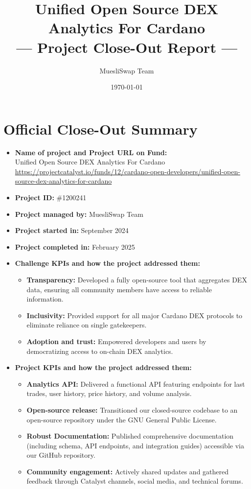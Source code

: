 \documentclass[11pt]{article}
\title{\textbf{Unified Open Source DEX Analytics For Cardano \\--- Project Close-Out Report ---}}
\author{MuesliSwap Team}
\date{\today}
\begin{document}
\maketitle

\section*{Official Close-Out Summary}
\begin{itemize}[leftmargin=1cm]
    \item \textbf{Name of project and Project URL on Fund:}\\
    Unified Open Source DEX Analytics For Cardano \\
    {\scriptsize\url{https://projectcatalyst.io/funds/12/cardano-open-developers/unified-open-source-dex-analytics-for-cardano}}
    
    \item \textbf{Project ID:} \#1200241
    
    \item \textbf{Project managed by:} MuesliSwap Team
    
    \item \textbf{Project started in:} September 2024
    
    \item \textbf{Project completed in:} February 2025
    
    \item \textbf{Challenge KPIs and how the project addressed them:}
    \begin{itemize}
        \item \textbf{Transparency:} Developed a fully open-source tool that aggregates DEX data, ensuring all community members have access to reliable information.
        \item \textbf{Inclusivity:} Provided support for all major Cardano DEX protocols to eliminate reliance on single gatekeepers.
        \item \textbf{Adoption and trust:} Empowered developers and users by democratizing access to on-chain DEX analytics.
    \end{itemize}
    
    \item \textbf{Project KPIs and how the project addressed them:}
    \begin{itemize}
        \item \textbf{Analytics API:} Delivered a functional API featuring endpoints for last trades, user history, price history, and volume analysis.
        \item \textbf{Open-source release:} Transitioned our closed-source codebase to an open-source repository under the GNU General Public License.
        \item \textbf{Robust Documentation:} Published comprehensive documentation (including schema, API endpoints, and integration guides) accessible via our GitHub repository.
        \item \textbf{Community engagement:} Actively shared updates and gathered feedback through Catalyst channels, social media, and technical forums.
    \end{itemize}
    

\end{itemize}
\end{document}
